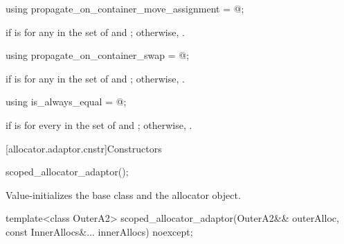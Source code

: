 %
\begin{itemdecl}
using propagate_on_container_move_assignment = @\seebelow@;
\end{itemdecl}

\begin{itemdescr}
\pnum
\ctype {} if
 is
 for any  in the set of  and
; otherwise, .
\end{itemdescr}

%
\begin{itemdecl}
using propagate_on_container_swap = @\seebelow@;
\end{itemdecl}

\begin{itemdescr}
\pnum
\ctype {} if
 is
 for any  in the set of  and
; otherwise, .
\end{itemdescr}

%
\begin{itemdecl}
using is_always_equal = @\seebelow@;
\end{itemdecl}

\begin{itemdescr}
\pnum
\ctype {} if
 is
 for every  in the set of  and
; otherwise, .
\end{itemdescr}

[allocator.adaptor.cnstr]{Constructors}

%
\begin{itemdecl}
scoped_allocator_adaptor();
\end{itemdecl}

\begin{itemdescr}
\pnum
\effects Value-initializes the  base class and the  allocator
object.
\end{itemdescr}

%
\begin{itemdecl}
template<class OuterA2>
  scoped_allocator_adaptor(OuterA2&& outerAlloc, const InnerAllocs&... innerAllocs) noexcept;
\end{itemdecl}

